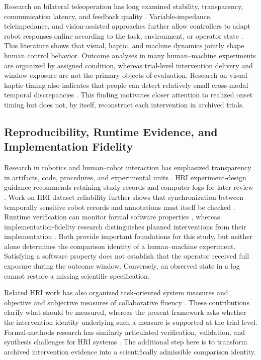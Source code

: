 \documentclass[journal]{IEEEtran}
\begin{document}
Research on bilateral teleoperation has long examined stability,
transparency, communication latency, and feedback quality
\cite{hannaford1989,lawrence1993,hokayem2006,passenberg2010,huang2019,rakita2020,louca2024,gong2024}.
Variable-impedance, teleimpedance, and vision-assisted approaches further
allow controllers to adapt robot responses online according to the task,
environment, or operator state
\cite{hogan1985,walker2010,buchli2011,ajoudani2012,peternel2018,abudakka2018,abudakka2020,michel2021,peternel2023,michel2023,huang2021,siegemund2024}.
This literature shows that visual, haptic, and machine dynamics jointly shape
human control behavior. Outcome analyses in many human--machine experiments
are organized by assigned condition, whereas trial-level intervention
delivery and window exposure are not the primary objects of evaluation.
Research on visual--haptic timing also indicates that people can detect
relatively small cross-modal temporal discrepancies \cite{vogels2004}. This
finding motivates closer attention to realized onset timing but does not, by
itself, reconstruct each intervention in archived trials.

\subsection{Reproducibility, Runtime Evidence, and Implementation Fidelity}

Research in robotics and human--robot interaction has emphasized transparency
in artifacts, code, procedures, and experimental units
\cite{bonsignorio2015,bonsignorio2017,gunes2022,aldana2023,bagchi2023,marchesi2024}.
HRI experiment-design guidance recommends retaining study records and computer
logs for later review \cite{hoffmanZhao2020}. Work on HRI dataset reliability
further shows that synchronization between temporally sensitive robot records
and annotations must itself be checked \cite{vigni2024}.
Runtime verification can monitor formal software properties \cite{huang2014},
whereas implementation-fidelity research distinguishes planned interventions
from their implementation \cite{carroll2007}. Both provide important
foundations for this study, but neither alone determines the comparison
identity of a human--machine experiment. Satisfying a software property does
not establish that the operator received full exposure during the outcome
window. Conversely, an observed state in a log cannot restore a missing
scientific specification.

Related HRI work has also organized task-oriented system measures
\cite{steinfeld2006} and objective and subjective measures of collaborative
fluency \cite{hoffman2019}. These contributions clarify what should be
measured, whereas the present framework asks whether the intervention identity
underlying such a measure is supported at the trial level. Formal-methods
research has similarly articulated verification, validation, and synthesis
challenges for HRI systems \cite{kressGazit2021}. The additional step here is
to transform archived intervention evidence into a scientifically admissible
comparison identity.
\end{document}
